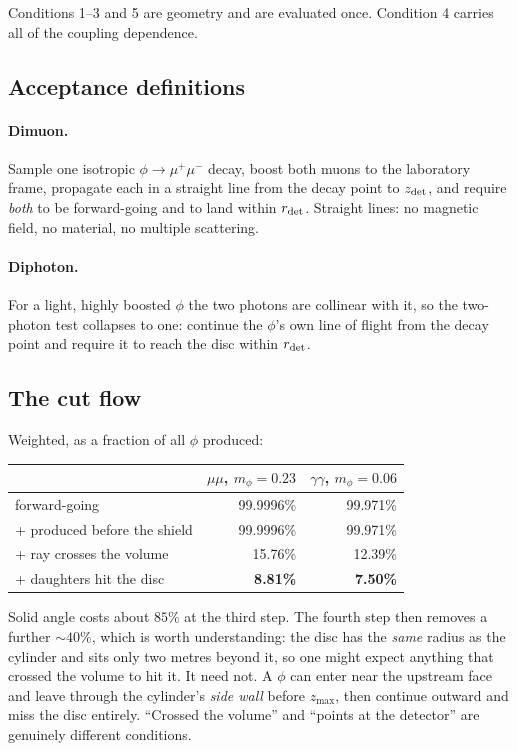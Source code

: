 \documentclass[11pt]{article}
\newcommand{\mphi}{m_\phi}
\begin{document}
\noindent Conditions 1--3 and 5 are geometry and are evaluated once. Condition
4 carries all of the coupling dependence.

\subsection{Acceptance definitions}

\paragraph{Dimuon.} Sample one isotropic $\phi\to\mu^+\mu^-$ decay, boost both
muons to the laboratory frame, propagate each in a straight line from the decay
point to $z_{\rm det}$, and require \emph{both} to be forward-going and to land
within $r_{\rm det}$. Straight lines: no magnetic field, no material, no
multiple scattering.

\paragraph{Diphoton.} For a light, highly boosted $\phi$ the two photons are
collinear with it, so the two-photon test collapses to one: continue the
$\phi$'s own line of flight from the decay point and require it to reach the
disc within $r_{\rm det}$.

\subsection{The cut flow}

Weighted, as a fraction of all $\phi$ produced:

\begin{center}
\begin{tabular}{lrr}
\toprule
 & $\mu\mu$, $\mphi=0.23$ & $\gamma\gamma$, $\mphi=0.06$ \\ \midrule
forward-going                     & 99.9996\% & 99.971\% \\
\quad + produced before the shield & 99.9996\% & 99.971\% \\
\quad + ray crosses the volume     & 15.76\%   & 12.39\%  \\
\quad + daughters hit the disc     & \textbf{8.81\%} & \textbf{7.50\%} \\
\bottomrule
\end{tabular}
\end{center}

\noindent Solid angle costs about $85\%$ at the third step. The fourth step
then removes a further $\sim40\%$, which is worth understanding: the disc has
the \emph{same} radius as the cylinder and sits only two metres beyond it, so
one might expect anything that crossed the volume to hit it. It need not. A
$\phi$ can enter near the upstream face and leave through the cylinder's
\emph{side wall} before $z_{\max}$, then continue outward and miss the disc
entirely. ``Crossed the volume'' and ``points at the detector'' are genuinely
different conditions.
\end{document}
